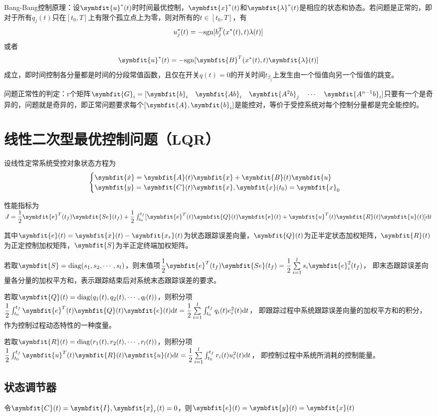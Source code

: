 \documentclass[11pt,a4paper]{ctexart}
\renewcommand{\d}{{\rm d}}
\newcommand{\bm}{\symbfit}
\begin{document}
        Bang-Bang控制原理：设$\bm{u}^*(t)$时时间最优控制，$\bm{x}^*(t)$和$\bm{\lambda}^*(t)$是相应的状态和协态。若问题是正常的，即对于所有$q_j(t)$只在$[t_0,T]$上有限个孤立点上为零，则对所有的$t\in[t_0,T]$，有
        \[
        u^*_j(t)=-{\rm sgn}[b_j^T(x^*(t),t)\lambda(t)]
        \]
        或者
        \[
        \bm{u}^*(t)=-{\rm sgn}[\bm{B}^T(x^*(t),t)\bm{\lambda}(t)]
        \]
        成立，即时间控制各分量都是时间的分段常值函数，且仅在开关$q(t)=0$的开关时间$t_{\beta_j}$上发生由一个恒值向另一个恒值的跳变。

        问题正常性的判定：r个矩阵$\bm{G}_i=[\bm{b}_i\quad\bm{Ab}_i\quad\bm{A^2b}_j\quad\cdots\quad\bm{A^{n-1}b}_i]$只要有一个是奇异的，问题就是奇异的，即正常问题要求每个$[\bm{A},\bm{b}_i]$是能控对，等价于受控系统对每个控制分量都是完全能控的。
\newpage
\section{线性二次型最优控制问题（LQR）}
    设线性定常系统受控对象状态方程为
    \[
    \begin{cases}
    \bm{\dot x}=\bm{A}(t)\bm{x}+\bm{B}(t)\bm{u}\\\bm{y}=\bm{C}(t)\bm{x},\bm{x}(t_0)=\bm{x}_0
    \end{cases}
    \]

    性能指标为$J=\dfrac12\bm{e}^T(t_f)\bm{Se}(t_f)+\dfrac12\int_{t_0}^{t_f}[\bm{e}^T(t)\bm{Q}(t)\bm{e}(t)+\bm{u}^T(t)\bm{R}(t)\bm{u}(t)]\d t$

    其中$\bm{e}(t)=\bm{x}(t)-\bm{x_r}(t)$为状态跟踪误差向量，$\bm{Q}(t)$为正半定状态加权矩阵，$\bm{R}(t)$为正定控制加权矩阵，$\bm{S}$为半正定终端加权矩阵。

    若取$\bm{S}={\rm diag}(s_1,s_2,\cdots,s_l)$，则末值项$\dfrac12\bm{e}^T(t_f)\bm{Se}(t_f)=\dfrac12\sum\limits_{i=1}^ls_i\bm{e}_i^2(t_f)$，
    即末态跟踪误差向量各分量的加权平方和，表示跟踪结束后对系统末态跟踪误差的要求。

    若取$\bm{Q}(t)={\rm diag}(q_1(t),q_2(t),\cdots,q_l(t))$，则积分项$\dfrac12\int_{t_0}^{t_f}\bm{e}^T(t)\bm{Q}(t)\bm{e}(t)\d t=\dfrac12\sum\limits_{i=1}^l\int_{t_0}^{t_f}q_i(t)e_i^2(t)\d t$，
    即跟踪过程中系统跟踪误差向量的加权平方和的积分，作为控制过程动态特性的一种度量。

    若取$\bm{R}(t)={\rm diag}(r_1(t),r_2(t),\cdots,r_l(t))$，则积分项$\dfrac12\int_{t_0}^{t_f}\bm{u}^T(t)\bm{R}(t)\bm{u}(t)\d t=\dfrac12\sum\limits_{i=1}^l\int_{t_0}^{t_f}r_i(t)u_i^2(t)\d t$，
    即控制过程中系统所消耗的控制能量。
    \subsection{状态调节器}
        令$\bm{C}(t)=\bm{I},\bm{x}_r(t)=0$，则$\bm{e}(t)=\bm{y}(t)=\bm{x}(t)$
\end{document}
